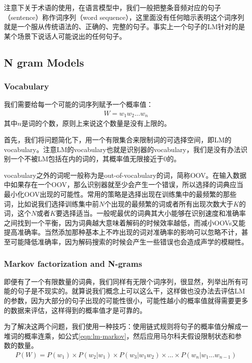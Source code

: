 注意下关于术语的使用，在语言模型中，我们一般把整条音频对应的句子（sentence）称作词序列（word sequence），这里面没有任何暗示表明这个词序列就是一个服从传统语法的、正确的、完整的句子。事实上一个句子的LM针对的是某个场景下说话人可能说出的任何句子。
\subsection{N gram Models}
\subsubsection{Vocabulary}
我们需要给每一个可能的词序列赋予一个概率值：
\begin{align}
	W=w_{1}w_{2}...w_{n}
\end{align}
其中$n$是词的个数，原则上来说这个数量是没有上限的。

首先，我们将问题简化下，用一个有限集合来限制词的可选择空间，即LM的vocabulary。注意LM的vocabulary也就是识别器的vocabulary，我们是没有办法识别一个不被LM包括在内的词的，其概率值无限接近于0的。

vocabulary之外的词呢一般称为是out-of-vocabulary的词，简称OOV。在输入数据中如果存在一个OOV，那么识别器就至少会产生一个错误，所以选择的词典应当最小化OOV出现的可能性。常用的策略是选择出现在训练集中的最频繁的那些词，比如说我们选择训练集中前$N$个出现的最频繁的词或者所有出现次数大于$K$的词，这个$N$或者$K$要选择适当。一般呢最优的词典其大小能够在识别速度和准确率之间找到一个平衡，因为词典越大意味着解码的时候效率越低，而减小OOVs又能提高准确率。当然添加那种基本上不咋出现的词对准确率的影响可以忽略不计，甚至可能降低准确率，因为解码搜索的时候会产生一些错误也会造成声学的模糊性。

\subsubsection{Markov factorization and N-grams}
即便有了一个有限数量的词典，我们同样有无限个词序列，很显然，列举出所有可能的句子是不现实的。就算说我们概念上可以这么干，这样做也没办法去评估LM的参数，因为大部分的句子出现的可能性很小，可能性越小的概率值就得需要更多的数据来评估，这样得到的概率值才是可靠的。

为了解决这两个问题，我们使用一种技巧：使用链式规则将句子的概率值分解成一堆词的概率连乘，如公式\ref{eqn:lm-markov}，然后应用马尔科夫假设限制状态和参数的数量。
\begin{align}
\label{eqn:lm-markov}
P(W) = P(w_1)\times{P(w_2|w_1)}\times{P(w_3|w_{1}w_{2})}\times...\times{P(w_n|w_{1}...w_{n-1})} 
\end{align}

